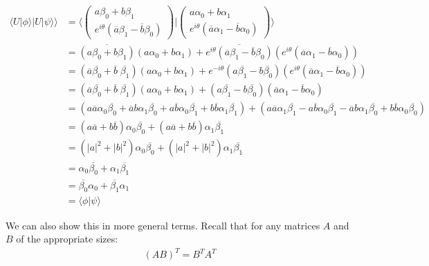 \documentclass{article}
\begin{document}
\begin{align*}
    \langle U |\phi\rangle | U |\psi\rangle \rangle
    &= \langle \begin{pmatrix}
   a\beta_0 + b\beta_1\\
   e^{i\theta}(
   \overline{a} \beta_1 - \overline{b} \beta_0)
\end{pmatrix} | \begin{pmatrix}
   a\alpha_0 + b\alpha_1\\
   e^{i\theta}(
   \overline{a} \alpha_1 - \overline{b} \alpha_0)
\end{pmatrix} \rangle\\
&= \overline{(a\beta_0 + b\beta_1)}(a\alpha_0 + b\alpha_1) + 
\overline{e^{i\theta}(
   \overline{a} \beta_1 - \overline{b} \beta_0)}(e^{i\theta}(
   \overline{a} \alpha_1 - \overline{b} \alpha_0))\\
&= (\overline{a}\overline{\beta_0} + \overline{b}\;\overline{\beta_1})(a\alpha_0 + b\alpha_1) + 
e^{-i\theta}(
   a \overline{\beta_1} - b \overline{\beta_0})(e^{i\theta}(
   \overline{a} \alpha_1 - \overline{b} \alpha_0))\\
&= (\overline{a}\overline{\beta_0} + \overline{b}\;\overline{\beta_1})(a\alpha_0 + b\alpha_1) + 
(
   a \overline{\beta_1} - b \overline{\beta_0})(
   \overline{a} \alpha_1 - \overline{b} \alpha_0)\\
&= (a\overline{a}\alpha_0\overline{\beta_0} + 
\overline{a}b\alpha_1\overline{\beta_0} +
a \overline{b}\alpha_0\overline{\beta_1} +
b \overline{b} \alpha_1 \overline{\beta_1}) +
(a \overline{a} \alpha_1 \overline{\beta_1} -
a \overline{b} \alpha_0 \overline{\beta_1} -
\overline{a} b \alpha_1 \overline{\beta_0} +
b \overline{b} \alpha_0 \overline{\beta_0})\\
&= (a\overline{a}+b\overline{b})\alpha_0\overline{\beta_0} +
(a \overline{a} + b \overline{b}) \alpha_1 \overline{\beta_1}\\
&= (|a|^2 + |b|^2)\alpha_0\overline{\beta_0} +
(|a|^2 + |b|^2) \alpha_1 \overline{\beta_1}\\
&= \alpha_0\overline{\beta_0} +
   \alpha_1 \overline{\beta_1}\\
&= \overline{\beta_0} \alpha_0 +
   \overline{\beta_1} \alpha_1 \\
&= \langle \phi | \psi \rangle
\end{align*}

We can also show this in more general terms. Recall that for any matrices $A$ and $B$ of the appropriate sizes:
\begin{align*}
    (AB)^T = B^T A^T
\end{align*}
\end{document}
